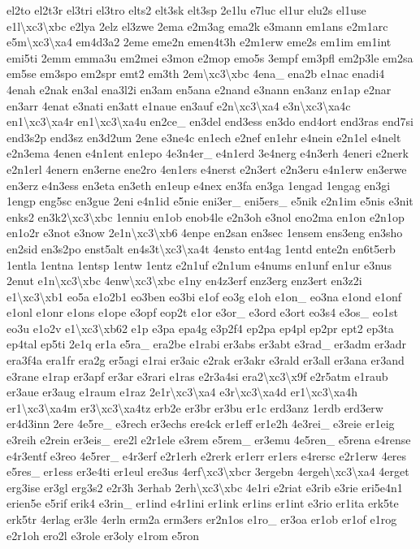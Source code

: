 \begin{DoxyCompactItemize}
el2to el2t3r el3tri el3tro elts2 elt3sk elt3sp 2e1lu e7luc el1ur elu2s el1use e1l\textbackslash{}xc3\textbackslash{}xbc e2lya 2elz el3zwe 2ema e2m3ag ema2k e3mann em1ans e2m1arc e5m\textbackslash{}xc3\textbackslash{}xa4 em4d3a2 2eme eme2n emen4t3h e2m1erw eme2s em1im em1int emi5ti 2emm emma3u em2mei e3mon e2mop emo5s 3empf em3pfl em2p3le em2sa em5se em3spo em2spr emt2 em3th 2em\textbackslash{}xc3\textbackslash{}xbc 4ena\-\_\- ena2b e1nac enadi4 4enah e2nak en3al ena3l2i en3am en5ana e2nand e3nann en3anz en1ap e2nar en3arr 4enat e3nati en3att e1naue en3auf e2n\textbackslash{}xc3\textbackslash{}xa4 e3n\textbackslash{}xc3\textbackslash{}xa4c en1\textbackslash{}xc3\textbackslash{}xa4r en1\textbackslash{}xc3\textbackslash{}xa4u en2ce\-\_\- en3del end3ess en3do end4ort end3ras end7si end3s2p end3sz en3d2um 2ene e3ne4c en1ech e2nef en1ehr e4nein e2n1el e4nelt e2n3ema 4enen e4n1ent en1epo 4e3n4er\-\_\- e4n1erd 3e4nerg e4n3erh 4eneri e2nerk e2n1erl 4enern en3erne ene2ro 4en1ers e4nerst e2n3ert e2n3eru e4n1erw en3erwe en3erz e4n3ess en3eta en3eth en1eup e4nex en3fa en3ga 1engad 1engag en3gi 1engp eng5sc en3gue 2eni e4n1id e5nie eni3er\-\_\- eni5ers\-\_\- e5nik e2n1im e5nis e3nit enks2 en3k2\textbackslash{}xc3\textbackslash{}xbc 1enniu en1ob enob4le e2n3oh e3nol eno2ma en1on e2n1op en1o2r e3not e3now 2e1n\textbackslash{}xc3\textbackslash{}xb6 4enpe en2san en3sec 1ensem ens3eng en3sho en2sid en3s2po enst5alt en4s3t\textbackslash{}xc3\textbackslash{}xa4t 4ensto ent4ag 1entd ente2n en6t5erb 1entla 1entna 1entsp 1entw 1entz e2n1uf e2n1um e4nums en1unf en1ur e3nus 2enut e1n\textbackslash{}xc3\textbackslash{}xbc 4enw\textbackslash{}xc3\textbackslash{}xbc e1ny en4z3erf enz3erg enz3ert en3z2i e1\textbackslash{}xc3\textbackslash{}xb1 eo5a e1o2b1 eo3ben eo3bi e1of eo3g e1oh e1on\-\_\- eo3na e1ond e1onf e1onl e1onr e1ons e1ope e3opf eop2t e1or e3or\-\_\- e3ord e3ort eo3s4 e3os\-\_\- eo1st eo3u e1o2v e1\textbackslash{}xc3\textbackslash{}xb62 e1p e3pa epa4g e3p2f4 ep2pa ep4pl ep2pr ept2 ep3ta ep4tal ep5ti 2e1q er1a e5ra\-\_\- era2be e1rabi er3abs er3abt e3rad\-\_\- er3adm er3adr era3f4a era1fr era2g er5agi e1rai er3aic e2rak er3akr e3rald er3all er3ana er3and e3rane e1rap er3apf er3ar e3rari e1ras e2r3a4si era2\textbackslash{}xc3\textbackslash{}x9f e2r5atm e1raub er3aue er3aug e1raum e1raz 2e1r\textbackslash{}xc3\textbackslash{}xa4 e3r\textbackslash{}xc3\textbackslash{}xa4d er1\textbackslash{}xc3\textbackslash{}xa4h er1\textbackslash{}xc3\textbackslash{}xa4m er3\textbackslash{}xc3\textbackslash{}xa4tz erb2e er3br er3bu er1c erd3anz 1erdb erd3erw er4d3inn 2ere 4e5re\-\_\- e3rech er3echs ere4ck er1eff er1e2h 4e3rei\-\_\- e3reie er1eig e3reih e2rein er3eis\-\_\- ere2l e2r1ele e3rem e5rem\-\_\- er3emu 4e5ren\-\_\- e5rena e4rense e4r3entf e3reo 4e5rer\-\_\- e4r3erf e2r1erh e2rerk er1err er1ers e4rersc e2r1erw 4eres e5res\-\_\- er1ess er3e4ti er1eul ere3us 4erf\textbackslash{}xc3\textbackslash{}xbcr 3ergebn 4ergeh\textbackslash{}xc3\textbackslash{}xa4 4erget erg3ise er3gl erg3s2 e2r3h 3erhab 2erh\textbackslash{}xc3\textbackslash{}xbc 4e1ri e2riat e3rib e3rie eri5e4n1 erien5e e5rif erik4 e3rin\-\_\- er1ind e4r1ini er1ink er1ins er1int e3rio er1ita erk5te erk5tr 4erlag er3le 4erln erm2a erm3ers er2n1os e1ro\-\_\- er3oa er1ob er1of e1rog e2r1oh ero2l e3role er3oly e1rom e5ron 
\end{DoxyCompactItemize}
